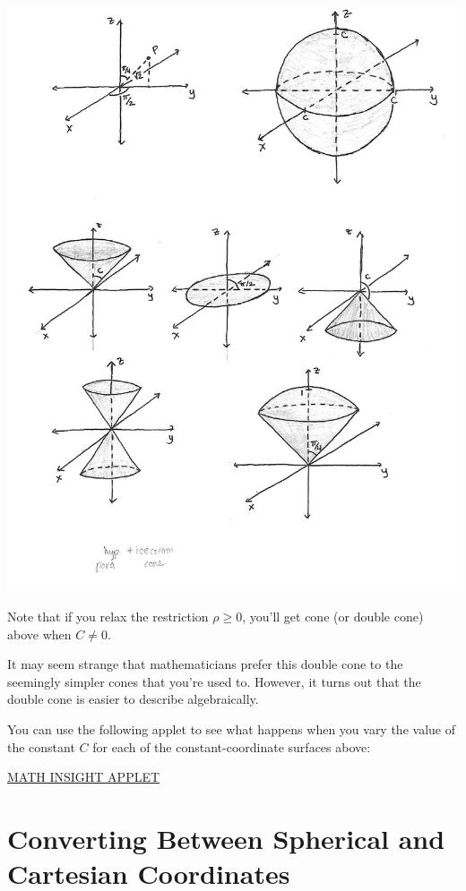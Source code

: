 \documentclass{ximera}
\begin{document}
\begin{image}
\includegraphics{cone}
\end{image}

Note that if you relax the restriction $\rho\geq 0$, you'll get cone (or double cone) above when $C\neq 0$.

It may seem strange that mathematicians prefer this double cone to the seemingly simpler cones that you're used to. However, it turns out that the double cone is easier to describe algebraically.

You can use the following applet to see what happens when you vary the value of the constant $C$ for each of the constant-coordinate surfaces above:

\href{https://mathinsight.org/spherical_coordinates}{MATH INSIGHT APPLET}

\section{Converting Between Spherical and Cartesian Coordinates}
\end{document}
